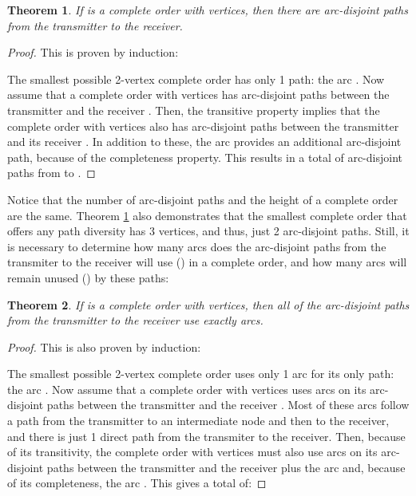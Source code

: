 \documentclass[5p,twocolumn]{elsarticle}
\newtheorem{theorem}{Theorem}
\begin{document}
\begin{theorem}\label{T:Num2}
If  is a complete order with  vertices, then there are  arc-disjoint paths from the transmitter to the receiver.
\end{theorem}

\begin{proof}
This is proven by induction:

The smallest possible 2-vertex complete order has only 1 path: the arc . Now assume that a complete order with  vertices has  arc-disjoint paths between the transmitter  and the receiver . Then, the transitive property implies that the complete order with  vertices also has  arc-disjoint paths between the transmitter  and its receiver . In addition to these, the arc  provides an additional arc-disjoint path, because of the completeness property. This results in a total of  arc-disjoint paths from  to .
\end{proof}

Notice that the number of arc-disjoint paths and the height of a complete order  are the same. Theorem \ref{T:Num2} also demonstrates that the smallest complete order that offers any path diversity has 3 vertices, and thus, just 2 arc-disjoint paths. Still, it is necessary to determine how many arcs does the   arc-disjoint paths from the transmiter to the receiver will use () in a complete order, and how many arcs will remain unused () by these paths:

\begin{theorem}\label{T:Num3}
If  is a complete order with  vertices, then all of the  arc-disjoint paths from the transmitter to the receiver use exactly  arcs.
\end{theorem}

\begin{proof}
This is also proven by induction:

The smallest possible 2-vertex complete order uses only 1 arc for its only path: the arc . Now assume that a complete order with  vertices uses  arcs on its  arc-disjoint paths between the transmitter  and the receiver . Most of these arcs follow a path from the transmitter to an intermediate node and then to the receiver, and there is just 1 direct path from the transmiter to the receiver. Then, because of its transitivity, the complete order with  vertices must also use  arcs on its arc-disjoint paths between the transmitter  and the receiver  plus the arc  and, because of its completeness, the arc . This gives a total of:


\end{proof}
\end{document}
